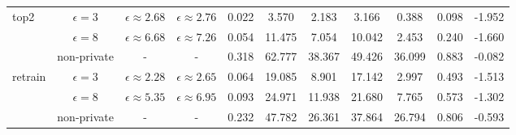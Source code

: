 \begin{table}[h]
\begin{tabular}{l c c c ccccccc}
\midrule
\multirow{3}[1]{*}{top2}
 & $\epsilon=3$  & $\epsilon \approx 2.68$  & $\epsilon \approx 2.76$  & 0.022 & 3.570 & 2.183 & 3.166 & 0.388 & 0.098 & -1.952\\
 & $\epsilon=8$  & $\epsilon \approx 6.68$  & $\epsilon \approx 7.26$  & 0.054 & 11.475 & 7.054 & 10.042 & 2.453 & 0.240 & -1.660\\
 & non-private  & -  & -  & 0.318 & 62.777 & 38.367 & 49.426 & 36.099 & 0.883 & -0.082\\

\midrule
\multirow{3}[1]{*}{retrain}
 & $\epsilon=3$  & $\epsilon \approx 2.28$  & $\epsilon \approx 2.65$  & 0.064 & 19.085 & 8.901 & 17.142 & 2.997 & 0.493 & -1.513\\
 & $\epsilon=8$  & $\epsilon \approx 5.35$  & $\epsilon \approx 6.95$  & 0.093 & 24.971 & 11.938 & 21.680 & 7.765 & 0.573 & -1.302\\
 & non-private  & -  & -  & 0.232 & 47.782 & 26.361 & 37.864 & 26.794 & 0.806 & -0.593\\

\bottomrule
\end{tabular}
\label{table:dart}
\end{table}
